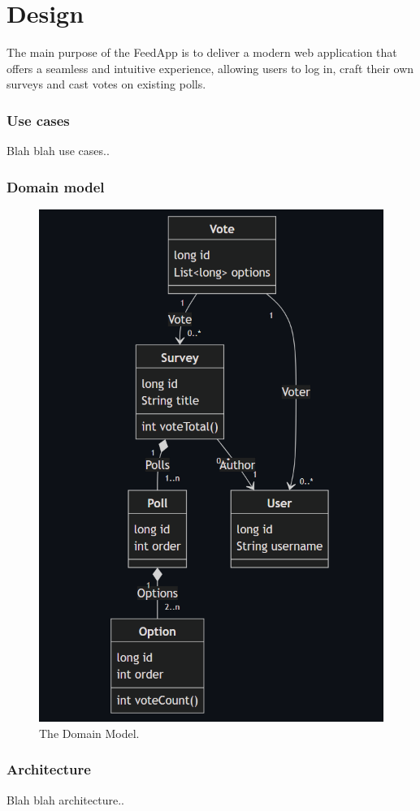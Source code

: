 \section{Design}
\label{sec:design}

The main purpose of the FeedApp is to deliver a modern web application that offers a seamless and intuitive experience, allowing users to log in, craft their own surveys and cast votes on existing polls.

\subsubsection*{Use cases}
Blah blah use cases..

\subsubsection*{Domain model}
\begin{figure}[thb]
	\centering
	\includegraphics[scale=0.5]{figs/domainmodel.png}
	\caption{The Domain Model.}
	\label{fig:domainmodel}
\end{figure}

\subsubsection*{Architecture}
Blah blah architecture..



